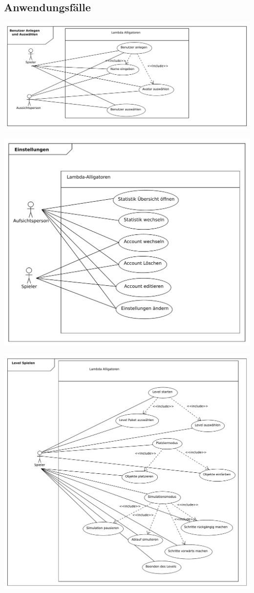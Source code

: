 \subsection{Anwendungsfälle}
\begin{center}
\includegraphics[scale=0.6]{Systemmodelle/add_use_case.pdf}
\end{center}
\begin{center}
\includegraphics[scale=0.6]{Systemmodelle/settings_use_case.pdf}
\end{center}
\clearpage
\begin{center}
\includegraphics[scale=0.6]{Systemmodelle/level_use_case.pdf}
\end{center}
